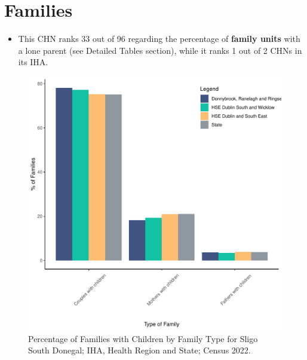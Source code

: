 \documentclass{article}
\begin{document}
\section{Families}\label{sect:Fam}
\begin{itemize}
\item This CHN ranks  33 out of 96 regarding the percentage of \textbf{family units} with a lone parent (see Detailed Tables section), while it ranks   1 out of 2 CHNs in its IHA.
\end{itemize}
\begin{figure}[H]
	\centering
	\includegraphics[width = 150mm]{../figures/FamED.pdf}
	\caption{Percentage of Families with Children by Family Type for Sligo South Donegal; IHA, Health Region and State; Census 2022.}
	\label{fig:vbnv}
	\end{figure}
	
\end{document}
